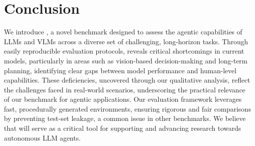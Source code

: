 \section{Conclusion}
We introduce \our{}, a novel benchmark designed to assess the agentic capabilities of LLMs and VLMs across a diverse set of challenging, long-horizon tasks. Through easily reproducible evaluation protocols, \our{} reveals critical shortcomings in current models, particularly in areas such as vision-based decision-making and long-term planning, identifying clear gaps between model performance and human-level capabilities. These deficiencies, uncovered through our qualitative analysis, reflect the challenges faced in real-world scenarios, underscoring the practical relevance of our benchmark for agentic applications. Our evaluation framework leverages fast, procedurally generated environments, ensuring rigorous and fair comparisons by preventing test-set leakage, a common issue in other benchmarks. We believe that \our{} will serve as a critical tool for supporting and advancing research towards autonomous LLM agents.
